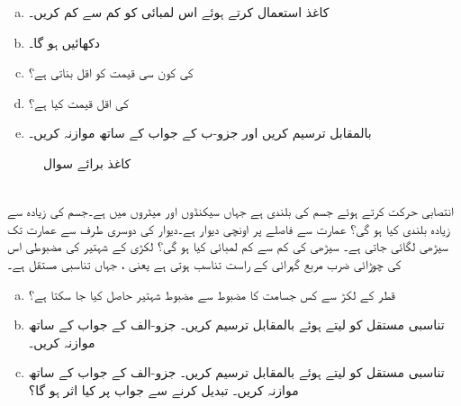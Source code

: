 \begin{enumerate}[a.]
\item
کاغذ استعمال کرتے ہوئے اس لمبائی کو کم سے کم کریں۔
\item
دکھائیں  ہو گا۔
\item
{} کی کون سی قیمت  کو اقل بناتی ہے؟
\item
{} کی اقل قیمت کیا ہے؟
\item
{} بالمقابل  ترسیم کریں اور جزو-ب کے جواب کے ساتھ موازنہ کریں۔
\end{enumerate}
\begin{figure}
\centering
{}
\caption{کاغذ برائے سوال }
\label{شکل_سوال_استعمال_کاغذ}
\end{figure}
\\
انتصابی حرکت کرتے  ہوئے  جسم کی بلندی  ہے جہاں  سیکنڈوں اور  میٹروں میں ہے۔جسم کی زیادہ سے زیادہ بلندی  کیا ہو گی؟
 عمارت سے   فاصلے پر  اونچی دیوار ہے۔دیوار کی دوسری طرف سے عمارت تک سیڑھی لگائی جاتی ہے۔ سیڑھی کی کم سے کم لمبائی کیا ہو گی؟ 
\quad
لکڑی کے  شہتیر کی مضبوطی  اس کی چوڑائی  ضرب مربع گہرائی  کے راست تناسب ہوتی ہے یعنی ، جہاں  تناسبی مستقل ہے۔
\begin{enumerate}[a.]
\item
{} قطر کے لکڑ سے  کس جسامت کا مضبوط سے مضبوط شہتیر حاصل کیا جا سکتا ہے؟  
\item
تناسبی مستقل کو  لیتے ہوئے  بالمقابل  ترسیم کریں۔ جزو-الف کے جواب کے ساتھ موازنہ کریں۔
\item
تناسبی مستقل کو  لیتے ہوئے  بالمقابل  ترسیم کریں۔ جزو-الف کے جواب کے ساتھ موازنہ کریں۔   تبدیل کرنے سے جواب پر کیا اثر ہو گا؟
\end{enumerate}
